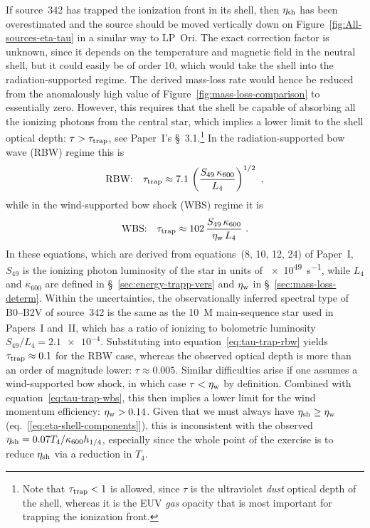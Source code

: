 If source~342 has trapped the ionization front in its shell, then
\(\eta_{\text{sh}}\) has been overestimated and the source should be moved
vertically down on Figure~\ref{fig:All-sources-eta-tau} in a similar
way to LP~Ori.  The exact correction factor is unknown, since it
depends on the temperature and magnetic field in the neutral shell,
but it could easily be of order 10, which would take the shell into
the radiation-supported regime.  The derived mass-loss rate would
hence be reduced from the anomalously high value of
Figure~\ref{fig:mass-loss-comparison} to essentially zero.  However,
this requires that the shell be capable of absorbing all the ionizing
photons from the central star, which implies a lower limit to the
shell optical depth: \(\tau > \tau_{\text{trap}}\), see Paper~I's
\S~3.1.\footnote{%
  Note that \(\tau_{\text{trap}} < 1\) is allowed, since \(\tau\) is the
  ultraviolet \emph{dust} optical depth of the shell, whereas it is
  the EUV \textit{gas} opacity that is most important for trapping the
  ionization front.  } %
In the radiation-supported bow wave (RBW) regime this is
\begin{equation}
  \label{eq:tau-trap-rbw}
  \text{RBW:}\quad \tau_{\text{trap}} \approx 7.1 \, \left( \frac{S_{49} \, \kappa_{600}}{L_4} \right)^{1/2} \ ,
\end{equation}
while in the wind-supported bow shock (WBS) regime it is
\begin{equation}
  \label{eq:tau-trap-wbs}
  \text{WBS:}\quad \tau_{\text{trap}} \approx 102 \, \frac{S_{49} \, \kappa_{600}}{\eta_{\text{w}}\, L_4}  \ .
\end{equation}
In these equations, which are derived from equations~(8, 10, 12, 24)
of Paper~I, \(S_{49}\) is the ionizing photon luminosity of the star
in units of \SI{e49}{s^{-1}}, while \(L_4\) and \(\kappa_{600}\) are
defined in \S~\ref{sec:energy-trapp-vers} and \(\eta_{\text{w}}\) in
\S~\ref{sec:mass-loss-determ}.  Within the uncertainties, the
observationally inferred spectral type of B0--B2V of source~342 is the
same as the \SI{10}{M_\odot} main-sequence star used in Papers~I
and~II, which has a ratio of ionizing to bolometric luminosity
\(S_{49}/L_4 = \num{2.1e-4}\).  Substituting into
equation~\eqref{eq:tau-trap-rbw} yields \(\tau_{\text{trap}} \approx 0.1 \)
for the RBW case, whereas the observed optical depth is more than an
order of magnitude lower: \(\tau \approx 0.005\).  Similar
difficulties arise if one assumes a wind-supported bow shock, in which
case \(\tau < \eta_{\text{w}}\) by definition.  Combined with
equation~\eqref{eq:tau-trap-wbs}, this then implies a lower limit for
the wind momentum efficiency: \(\eta_{\text{w}} > 0.14\).  Given that we
must always have \(\eta_{\text{sh}} \ge \eta_{\text{w}}\)
(eq.~[\ref{eq:eta-shell-components}]), this is inconsistent with the
observed \(\eta_{\text{sh}} = 0.07 T_4 / \kappa_{600} h_{1/4}\), especially
since the whole point of the exercise is to reduce \(\eta_{\text{sh}}\) via
a reduction in \(T_4\).

